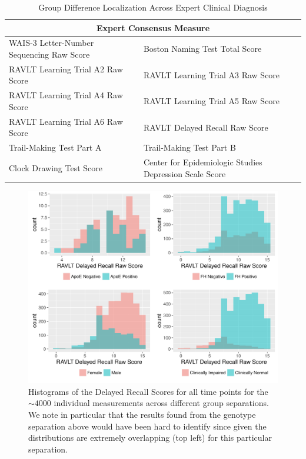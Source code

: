 \begin{table}
	\centering
	\begin{tabular}{p{5.5cm}p{6cm}}
		\toprule
		\multicolumn{2}{c}{\textbf{Expert Consensus Measure}}\\ \midrule \midrule
		WAIS-3 Letter-Number Sequencing Raw Score &
		Boston Naming Test Total Score \\
		RAVLT Learning Trial A2 Raw Score &
		RAVLT Learning Trial A3 Raw Score \\
		RAVLT Learning Trial A4 Raw Score &
		RAVLT Learning Trial A5 Raw Score \\
		RAVLT Learning Trial A6 Raw Score &
		RAVLT Delayed Recall Raw Score \\
		Trail-Making Test Part A &
		Trail-Making Test Part B \\
		Clock Drawing Test Score &
		Center for Epidemiologic Studies Depression Scale Score \\
		\bottomrule
		\bottomrule
	\end{tabular}
	\caption[Localization across expert diagnosis]{Group Difference Localization Across Expert Clinical Diagnosis}
	\label{fig:cogcc}
\end{table}

\begin{figure}
\centering
\includegraphics[width=\textwidth]{3_covtraj/figs/DRRAWHists_cogonly.pdf}
\caption[Delayed Recall Histograms]{Histograms of the Delayed Recall Scores for all time points for the $\sim 4000$ individual measurements across different group separations. We note in particular that the results found from the genotype separation above would have been hard to identify since given the distributions are extremely overlapping (top left) for this particular separation.}
\end{figure}